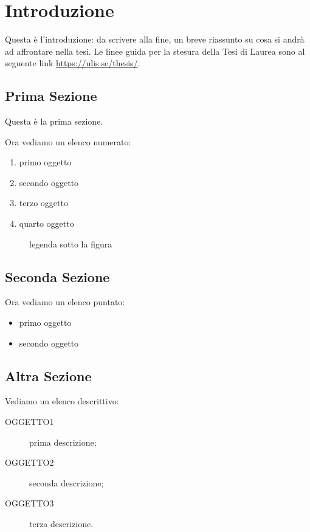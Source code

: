 \documentclass[12pt,a4paper,openright,twoside]{report}
\begin{document}
\chapter{Introduzione} 
\lhead[\fancyplain{}{\bfseries\thepage}]{\fancyplain{}{\bfseries\rightmark}}
Questa \`e l'introduzione: da scrivere alla fine, un breve riassunto su cosa si andr\`a ad affrontare nella tesi.
Le linee guida per la stesura della Tesi di Laurea sono al seguente link \href{https://ulis.se/thesis/}{https://ulis.se/thesis/}.

\section{Prima Sezione} %
Questa \`e la prima sezione.

Ora vediamo un elenco numerato: %
\begin{enumerate}
\item primo oggetto
\item secondo oggetto
\item terzo oggetto
\item quarto oggetto
\end{enumerate}

\begin{figure}[h] %
\begin{center} %

\caption[legenda elenco figure]{legenda sotto la figura}\label{fig:prima}
\end{center}
\end{figure}


\section{Seconda Sezione}
Ora vediamo un elenco puntato:
\begin{itemize} %
\item primo oggetto
\item secondo oggetto
\end{itemize}


\section{Altra Sezione}
Vediamo un elenco descrittivo:
\begin{description} %
  \item[OGGETTO1] prima descrizione;
  \item[OGGETTO2] seconda descrizione;
  \item[OGGETTO3] terza descrizione.
\end{description}
\end{document}
